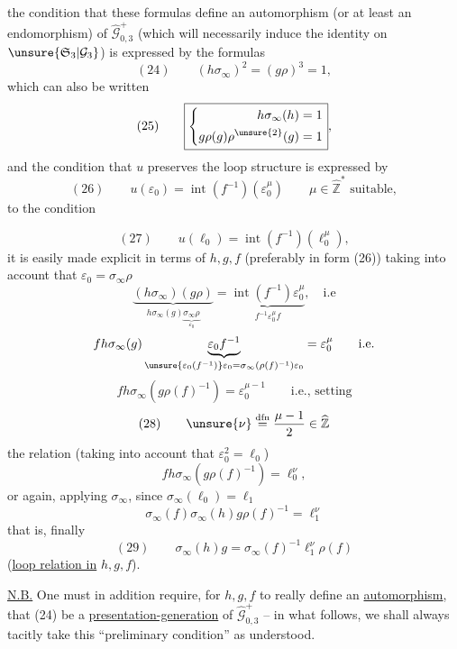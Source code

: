 the condition that these formulas define an automorphism (or at least an endomorphism) of $\widehat{\mathcal G}_{0,3}^{+}$ (which will necessarily induce the identity on $\unsure{\mathfrak S_3|\mathcal G_3}$) is expressed by the formulas
\[
(24)\qquad (h\sigma_\infty)^{2}=(g\rho)^{3}=1,
\]
which can also be written
\[
(25)\qquad
\boxed{\left\{\begin{aligned}
h\sigma_\infty(h)&=1\\
g\rho(g)\rho^{\unsure{2}}(g)&=1
\end{aligned}\right.},
\]
and the condition that $u$ preserves the loop structure is expressed by
\[
(26)\qquad u(\varepsilon_0)=\operatorname{int}(f^{-1})(\varepsilon_0^{\mu})
\qquad \mu\in\widehat{\mathbb Z}^{*}\text{ suitable},
\]
 to the condition


\[
(27)\qquad
u(\ell_0)=\operatorname{int}(f^{-1})(\ell_0^{\mu}),
\]
it is easily made explicit in terms of $h,g,f$ (preferably in form (26)) taking into account that $\varepsilon_0=\sigma_\infty\rho$
\[
\underbrace{(h\sigma_\infty)(g\rho)}_{h\sigma_\infty(g)\underbrace{\sigma_\infty\rho}_{\varepsilon_0}}
=\underbrace{\operatorname{int}(f^{-1})\varepsilon_0^{\mu}}_{f^{-1}\varepsilon_0^{\mu}f},\quad\text{i.e}
\]
\[
f h\sigma_\infty(g)\underbrace{\varepsilon_0 f^{-1}}_{\unsure{\varepsilon_0(f^{-1})}\varepsilon_0=\sigma_\infty(\rho(f)^{-1})\varepsilon_0}
=\varepsilon_0^{\mu}\qquad\text{i.e.}
\]
\[
f h\sigma_\infty(g\rho(f)^{-1})=\varepsilon_0^{\mu-1}
\qquad\text{i.e., setting}
\]
\[
(28)\qquad \unsure{\nu}\overset{\mathrm{dfn}}{=}\frac{\mu-1}{2}\in\widehat{\mathbb Z}
\]
the relation (taking into account that $\varepsilon_0^{2}=\ell_0$)
\[
f h\sigma_\infty(g\rho(f)^{-1})=\ell_0^{\nu},
\]
or again, applying $\sigma_\infty$, since $\sigma_\infty(\ell_0)=\ell_1$
\[
\sigma_\infty(f)\sigma_\infty(h)g\rho(f)^{-1}=\ell_1^{\nu}
\]
that is, finally
\[
(29)\qquad
\boxed{\sigma_\infty(h)g=\sigma_\infty(f)^{-1}\ell_1^{\nu}\rho(f)}
\]
(\uline{loop relation in} $h,g,f$).


\uline{N.B.} One must in addition require, for $h,g,f$ to really define an \uline{automorphism}, that (24) be a \uline{presentation-generation} of $\widehat{\mathcal G}_{0,3}^{+}$ -- in what follows, we shall always tacitly take this ``preliminary condition'' as understood.
